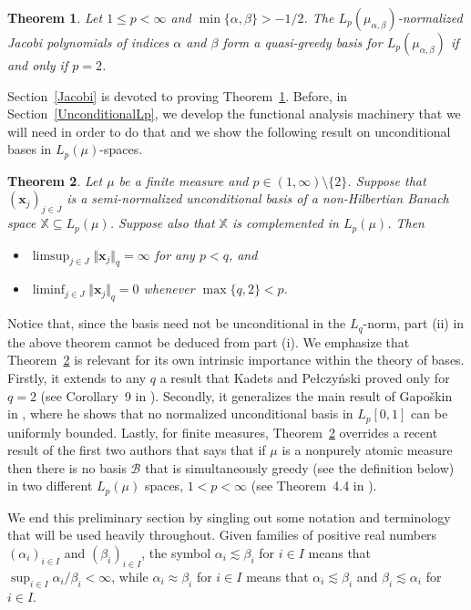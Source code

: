 \documentclass[11pt, leqno]{amsart}
\newtheorem{theorem}{Theorem}[section]
\theoremstyle{remark}
\numberwithin{equation}{section}
\newcommand{\XX}{\ensuremath{\mathbb{X}}}
\newcommand{\xx}{\ensuremath{\mathbf{x}}}
\newcommand{\BB}{\mathcal{B}}
\begin{document}
\begin{theorem}
\label{result:MainTheorem}
Let $1\le p<\infty$ and $\min\{\alpha,\beta\}> -1/2$. The $L_p(\mu_{\alpha,\beta})$-normalized Jacobi polynomials of indices $\alpha$ and $\beta$ form a quasi-greedy basis for $L_p(\mu_{\alpha,\beta})$ if and only if $p=2$.
\end{theorem}


Section~\ref{Jacobi} is devoted to proving Theorem~\ref{result:MainTheorem}.
Before, in Section~\ref{UnconditionalLp}, we develop
the functional analysis machinery that we will need in order to do that and 
we show the following result on unconditional bases in $L_p(\mu)$-spaces.

\begin{theorem}
\label{NotSimultaneouslyBounded}Let $\mu$ be a finite measure and $p\in(1,\infty)\setminus\{2\}$. Suppose that $(\xx_j)_{j\in J}$ is a semi-normalized unconditional basis of a non-Hilbertian Banach space $\XX\subseteq L_p(\mu)$. Suppose also that $\XX$ is complemented in $L_p(\mu)$. Then
\begin{itemize}
\item[(i)] $\limsup_{j\in J} \Vert \xx_j\Vert_q=\infty$ for any $p<q$, and
\item[(ii)] $\liminf_{j\in J} \Vert \xx_j\Vert_q=0$ whenever $\max\{q,2\}<p$.
\end{itemize}
\end{theorem}

Notice that, since the basis need not  be unconditional in the 
$L_q$-norm, part (ii) in the above theorem cannot be deduced from part (i). We emphasize that Theorem~\ref{NotSimultaneouslyBounded} is relevant for its own intrinsic importance within the theory of bases. Firstly, it extends to any $q$ a result that Kadets and Pe{\l}czy{\'n}ski proved only for $q=2$ (see Corollary~9 in  \cite{KadPel1962}). Secondly, it  generalizes the main result of Gapo\v{s}kin in \cite{Gaposkin1958}, where he shows that no normalized unconditional basis in
$L_p[0,1]$ can be uniformly bounded. Lastly, for finite measures, Theorem~\ref{NotSimultaneouslyBounded} overrides a recent result of the first two authors that says that if $\mu$ is a nonpurely atomic measure then there is no basis $\BB$ that is simultaneously greedy (see the definition below) in two different $L_{p}(\mu)$ spaces, $1<p<\infty$ (see Theorem~4.4 in \cite{AA2015}). 


We end this preliminary section by singling out some notation and terminology that will be used heavily throughout.
Given families of positive real numbers $(\alpha_i)_{i\in I}$ and $(\beta_i)_{i\in I}$, the symbol $\alpha_i\lesssim \beta_i$ for $i\in I$ means that
$\sup_{i\in I}\alpha_i/\beta_i <\infty$, while $\alpha_i\approx \beta_i$ for $i\in I$ means that $\alpha_i\lesssim \beta_i$ and $\beta_i\lesssim \alpha_i$ for $i\in I$.
\end{document}
